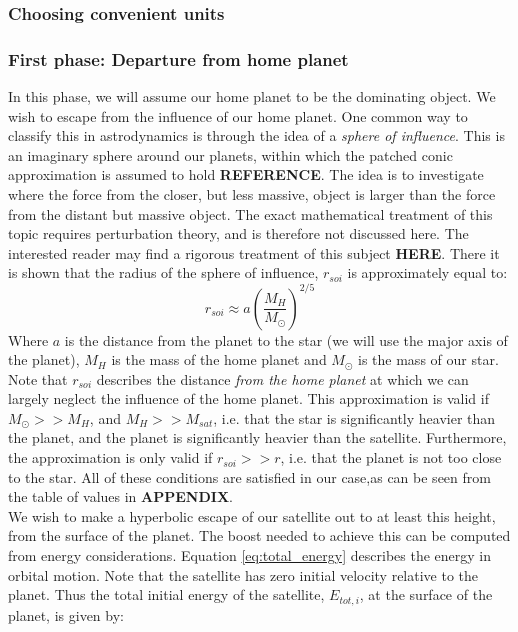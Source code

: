 \documentclass[a4paper,10pt,english]{article}
\begin{document}
\subsubsection{Choosing convenient units}

\subsubsection{First phase: Departure from home planet}\label{Leaving_home_SOI_section}
In this phase, we will assume our home planet to be the dominating object. We wish to escape from the influence of our home planet. One common way to classify this in astrodynamics is through the idea of a \textit{sphere of influence}. This is an imaginary sphere around our planets, within which the patched conic approximation is assumed to hold \textbf{REFERENCE}. The idea is to investigate where the force from the closer, but less massive, object is larger than the force from the distant but massive object. The exact mathematical treatment of this topic requires perturbation theory, and is therefore not discussed here. The interested reader may find a rigorous treatment of this subject \textbf{HERE}. There it is shown that the radius of the sphere of influence, $r_{soi}$ is approximately equal to:
\begin{equation}\label{eq:rSOI}
r_{soi}\approx a\left(\frac{M_H}{M_{\odot}}\right)^{2/5}
\end{equation}
Where $a$ is the distance from the planet to the star (we will use the major axis of the planet), $M_H$ is the mass of the home planet and $M_{\odot}$ is the mass of our star. Note that $r_{soi}$ describes the distance \textit{from the home planet} at which we can largely neglect the influence of the home planet. This approximation is valid if $M_{\odot}>>M_H$, and $M_H>>M_{sat}$, i.e. that the star is significantly heavier than the planet, and the planet is significantly heavier than the satellite. Furthermore, the approximation is only valid if $r_{soi}>>r$, i.e. that the planet is not too close to the star. All of these conditions are satisfied in our case,as can be seen from the table of values in \textbf{APPENDIX}.\\
\linebreak
We wish to make a hyperbolic escape of our satellite out to at least this height, from the surface of the planet. The boost needed to achieve this can be computed from energy considerations. Equation \ref{eq:total_energy} describes the energy in orbital motion. Note that the satellite has zero initial velocity relative to the planet. Thus the total initial energy of the satellite, $E_{tot, i}$, at the surface of the planet, is given by:
\end{document}

